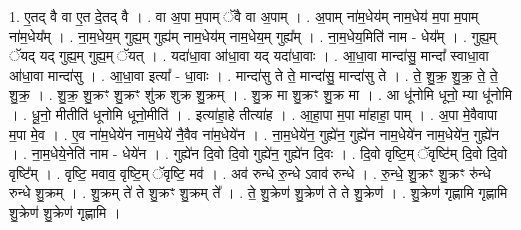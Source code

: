 \documentclass[17pt]{extarticle}
\begin{document}
1. ए॒तद् वै वा ए॒त दे॒तद् वै । . वा अ॒पा म॒पाम् ॅवै वा अ॒पाम् । . अ॒पाम् ना॑म॒धेय॑म् नाम॒धेय॑ म॒पा म॒पाम् ना॑म॒धेय᳚म् । . ना॒म॒धेय॒म् गुह्य॒म् गुह्य॑म् नाम॒धेय॑म् नाम॒धेय॒म् गुह्य᳚म् । . ना॒म॒धेय॒मिति॑ नाम - धेय᳚म् । . गुह्य॒म् ॅयद् यद् गुह्य॒म् गुह्य॒म् ॅयत् । . यदा॑धा॒वा आ॑धा॒वा यद् यदा॑धा॒वाः । . आ॒धा॒वा मान्दा॑सु॒ मान्दा᳚ स्वाधा॒वा आ॑धा॒वा मान्दा॑सु । . आ॒धा॒वा इत्या᳚ - धा॒वाः । . मान्दा॑सु ते ते॒ मान्दा॑सु॒ मान्दा॑सु ते । . ते॒ शु॒क्र॒ शु॒क्र॒ ते॒ ते॒ शु॒क्र॒ । . शु॒क्र॒ शु॒क्रꣳ शु॒क्रꣳ शु॑क्र शुक्र शु॒क्रम् । . शु॒क्र मा शु॒क्रꣳ शु॒क्र मा । . आ धू॑नोमि धूनो॒ म्या धू॑नोमि । . धू॒नो॒ मीतीति॑ धूनोमि धूनो॒मीति॑ । . इत्या॑हा॒हे तीत्या॑ह । . आ॒हा॒पा म॒पा मा॑हाहा॒ पाम् । . अ॒पा मे॒वैवापा म॒पा मे॒व । . ए॒व ना॑म॒धेये॑न नाम॒धेये॑ नै॒वैव ना॑म॒धेये॑न । . ना॒म॒धेये॑न॒ गुह्ये॑न॒ गुह्ये॑न नाम॒धेये॑न नाम॒धेये॑न॒ गुह्ये॑न । . ना॒म॒धेये॒नेति॑ नाम - धेये॑न । . गुह्ये॑न दि॒वो दि॒वो गुह्ये॑न॒ गुह्ये॑न दि॒वः । . दि॒वो वृष्टि॒म् ॅवृष्टि॑म् दि॒वो दि॒वो वृष्टि᳚म् । . वृष्टि॒ मवाव॒ वृष्टि॒म् ॅवृष्टि॒ मव॑ । . अव॑ रुन्धे रु॒न्धे ऽवाव॑ रुन्धे । . रु॒न्धे॒ शु॒क्रꣳ शु॒क्रꣳ रु॑न्धे रुन्धे शु॒क्रम् । . शु॒क्रम् ते॑ ते शु॒क्रꣳ शु॒क्रम् ते᳚ । . ते॒ शु॒क्रेण॑ शु॒क्रेण॑ ते ते शु॒क्रेण॑ । . शु॒क्रेण॑ गृह्णामि गृह्णामि शु॒क्रेण॑ शु॒क्रेण॑ गृह्णामि । \newline
\end{document}
